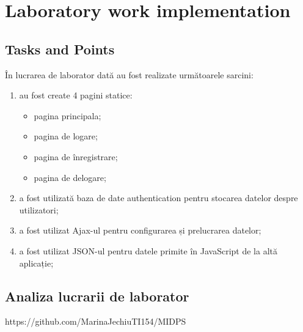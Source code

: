 \section{Laboratory work implementation}

\subsection{Tasks and Points}

În lucrarea de laborator dată au fost realizate următoarele sarcini:
\begin{enumerate}
\item au fost create 4 pagini statice:
	\begin{itemize}
	\item pagina principala;
	\item pagina de logare;
	\item pagina de înregistrare;
	\item pagina de delogare;
	\end{itemize}
\item a fost utilizată baza de date authentication pentru stocarea datelor despre utilizatori;
\item a fost utilizat Ajax-ul pentru configurarea și prelucrarea datelor;
\item a fost utilizat JSON-ul pentru datele primite în JavaScript de la altă aplicație;
\end{enumerate}


\subsection{Analiza lucrarii de laborator}

https://github.com/MarinaJechiuTI154/MIDPS

